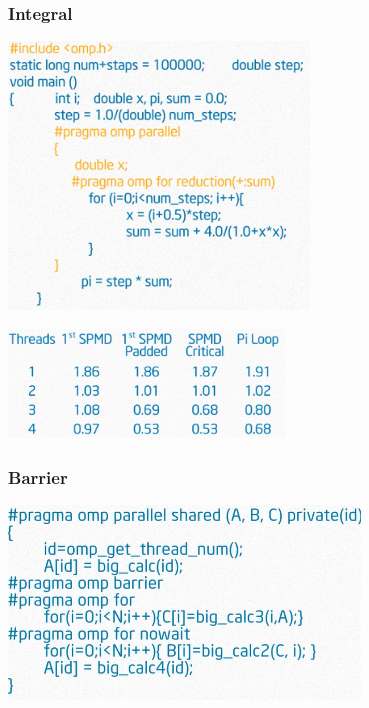 \documentclass{beamer}
\begin{document}
\begin{frame}[plain]
  \frametitle{Integral}
  \centering
  \includegraphics[width=0.6\textwidth]{integral-worksharing}\pause

  \includegraphics[width=0.55\textwidth]{integral-worksharing-time}
\end{frame}


\begin{frame}
  \frametitle{Barrier}
  \centering
  \includegraphics[width=0.7\textwidth]{barrier}
\end{frame}


\end{document}
